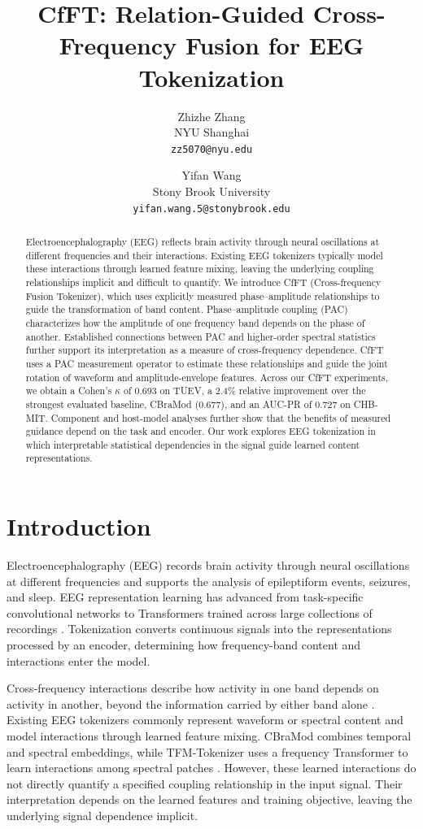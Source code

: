 \documentclass[10pt,twocolumn,letterpaper]{article}
\title{CfFT: Relation-Guided Cross-Frequency Fusion for EEG Tokenization}
\author{Zhizhe Zhang\\NYU Shanghai\\{\tt\small zz5070@nyu.edu}\and
Yifan Wang\\Stony Brook University\\{\tt\small yifan.wang.5@stonybrook.edu}}
\begin{document}
\maketitle

\begin{abstract}
Electroencephalography (EEG) reflects brain activity through neural
oscillations at different frequencies and their interactions. Existing EEG
tokenizers typically model these interactions through learned feature mixing,
leaving the underlying coupling relationships implicit and difficult to
quantify. We introduce CfFT (Cross-frequency Fusion Tokenizer), which uses
explicitly measured phase--amplitude relationships to guide the transformation
of band content. Phase--amplitude coupling (PAC) characterizes how the
amplitude of one frequency band depends on the phase of another. Established
connections between PAC and higher-order spectral statistics further support
its interpretation as a measure of cross-frequency dependence. CfFT uses a PAC
measurement operator to estimate these relationships and guide the joint
rotation of waveform and amplitude-envelope features. Across our CfFT
experiments, we obtain a Cohen's $\kappa$ of 0.693 on TUEV, a 2.4\% relative
improvement over the strongest evaluated baseline, CBraMod (0.677), and an
AUC-PR of 0.727 on CHB-MIT. Component and host-model analyses further show
that the benefits of measured guidance depend on the task and encoder. Our
work explores EEG tokenization in which interpretable statistical dependencies
in the signal guide learned content representations.
\end{abstract}

\section{Introduction}
\label{sec:intro}
Electroencephalography (EEG) records brain activity through neural
oscillations at different frequencies and supports the analysis of
epileptiform events, seizures, and sleep. EEG representation learning has
advanced from task-specific convolutional networks to Transformers trained
across large collections of recordings
\citep{schirrmeister2017deep,lawhern2018eegnet,yang2023biot,jiang2024labram,wang2025cbramod}.
Tokenization converts continuous signals into the representations
processed by an encoder, determining how frequency-band content and
interactions enter the model.

Cross-frequency interactions describe how activity in one band depends
on activity in another, beyond the information carried by either band
alone \citep{canolty2010functional,hyafil2015neural}.
Existing EEG tokenizers commonly represent waveform or spectral content
and model interactions through learned feature mixing. CBraMod combines
temporal and spectral embeddings, while TFM-Tokenizer uses a frequency
Transformer to learn interactions among spectral patches
\citep{wang2025cbramod,pradeepkumar2026tfm}.
However, these learned interactions do not directly quantify a specified
coupling relationship in the input signal. Their interpretation depends
on the learned features and training objective, leaving the underlying
signal dependence implicit.
\end{document}
